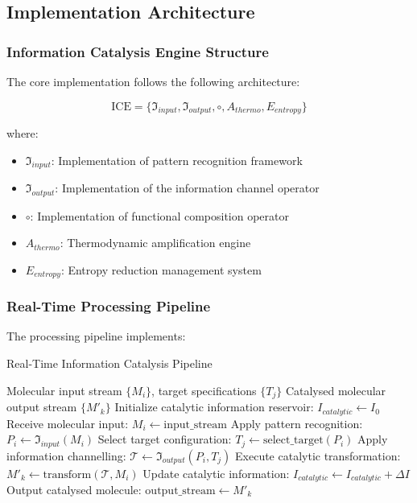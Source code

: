 \documentclass[12pt,a4paper]{article}
\begin{document}
\subsection{Implementation Architecture}

\subsubsection{Information Catalysis Engine Structure}

The core implementation follows the following architecture:

\begin{equation}
\text{ICE} = \{\mathfrak{I}_{input}, \mathfrak{I}_{output}, \circ, A_{thermo}, E_{entropy}\}
\end{equation}

where:
\begin{itemize}
\item $\mathfrak{I}_{input}$: Implementation of pattern recognition framework
\item $\mathfrak{I}_{output}$: Implementation of the information channel operator
\item $\circ$: Implementation of functional composition operator
\item $A_{thermo}$: Thermodynamic amplification engine
\item $E_{entropy}$: Entropy reduction management system
\end{itemize}


\subsubsection{Real-Time Processing Pipeline}

The processing pipeline implements:

\begin{algorithm}[H]
\caption{Real-Time Information Catalysis Pipeline}
\begin{algorithmic}[1]
\REQUIRE Molecular input stream $\{M_i\}$, target specifications $\{T_j\}$
\ENSURE Catalysed molecular output stream $\{M'_k\}$
\STATE Initialize catalytic information reservoir: $I_{catalytic} \leftarrow I_0$
    \STATE Receive molecular input: $M_i \leftarrow \text{input\_stream}$
    \STATE Apply pattern recognition: $P_i \leftarrow \mathfrak{I}_{input}(M_i)$
    \STATE Select target configuration: $T_j \leftarrow \text{select\_target}(P_i)$
    \STATE Apply information channelling: $\mathcal{T} \leftarrow \mathfrak{I}_{output}(P_i, T_j)$
    \STATE Execute catalytic transformation: $M'_k \leftarrow \text{transform}(\mathcal{T}, M_i)$
    \STATE Update catalytic information: $I_{catalytic} \leftarrow I_{catalytic} + \Delta I$
    \STATE Output catalysed molecule: $\text{output\_stream} \leftarrow M'_k$
\ENDWHILE
\end{algorithmic}
\end{algorithm}
\end{document}
